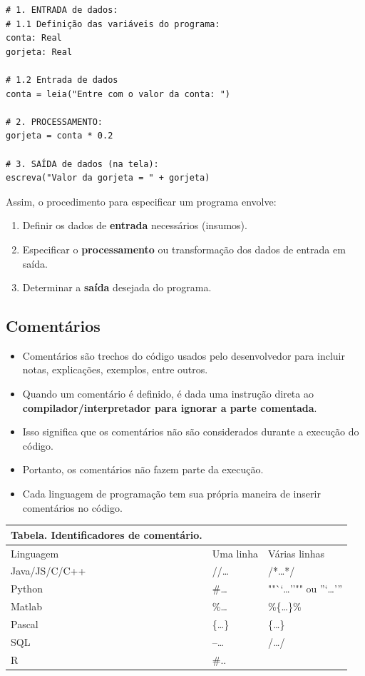 \documentclass[12pt,a4paper]{article}
\providecommand{\tightlist}{%
      \setlength{\itemsep}{0pt}\setlength{\parskip}{0pt}}
\begin{document}
    \begin{verbatim}
# 1. ENTRADA de dados:
# 1.1 Definição das variáveis do programa:
conta: Real
gorjeta: Real

# 1.2 Entrada de dados
conta = leia("Entre com o valor da conta: ")

# 2. PROCESSAMENTO:
gorjeta = conta * 0.2

# 3. SAÍDA de dados (na tela):
escreva("Valor da gorjeta = " + gorjeta)
\end{verbatim}

    Assim, o procedimento para especificar um programa envolve:

\begin{enumerate}
\def\labelenumi{\arabic{enumi}.}
\tightlist
\item
  Definir os dados de \textbf{entrada} necessários (insumos).
\item
  Especificar o \textbf{processamento} ou transformação dos dados de
  entrada em saída.
\item
  Determinar a \textbf{saída} desejada do programa.
\end{enumerate}

    \hypertarget{comentuxe1rios}{%
\subsection{Comentários}\label{comentuxe1rios}}

    \begin{itemize}
\tightlist
\item
  Comentários são trechos do código usados pelo desenvolvedor para
  incluir notas, explicações, exemplos, entre outros.
\item
  Quando um comentário é definido, é dada uma instrução direta ao
  \textbf{compilador/interpretador para ignorar a parte comentada}.
\item
  Isso significa que os comentários não são considerados durante a
  execução do código.
\item
  Portanto, os comentários não fazem parte da execução.
\item
  Cada linguagem de programação tem sua própria maneira de inserir
  comentários no código.
\end{itemize}

    \begin{longtable}[]{@{}lll@{}}
\toprule
Tabela. Identificadores de comentário. & &\tabularnewline
\midrule
\endhead
Linguagem & Uma linha & Várias linhas\tabularnewline
Java/JS/C/C++ & //\ldots{} & /*\ldots{}*/\tabularnewline
Python & \#\ldots{} & ""``\ldots{}''"" ou ''`\ldots{}'''\tabularnewline
Matlab & \%\ldots{} & \%\{\ldots{}\}\%\tabularnewline
Pascal & \{\ldots{}\} & \{\emph{\ldots{}}\}\tabularnewline
SQL & --\ldots{} & /\emph{\ldots{}}/\tabularnewline
R & \#.. &\tabularnewline
\bottomrule
\end{longtable}
\end{document}
